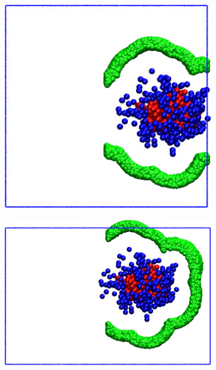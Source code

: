 \begin{figure}[b]
  \begin{subfigure}{0.20\textwidth}
    \includegraphics[height=0.9\textwidth]{AddToSystem-A-ld_hd_cx.jpg}
    \caption{}
  \end{subfigure}
  \hspace{15pt}
  \begin{subfigure}{0.20\textwidth}
    \includegraphics[width=1.0\textwidth]{AddToSystem-A-ld_hd_cx_b.jpg}
    \caption{}
  \end{subfigure}
  \hspace{15pt}
  \begin{subfigure}{0.20\textwidth}

\end{subfigure}
\end{figure}
